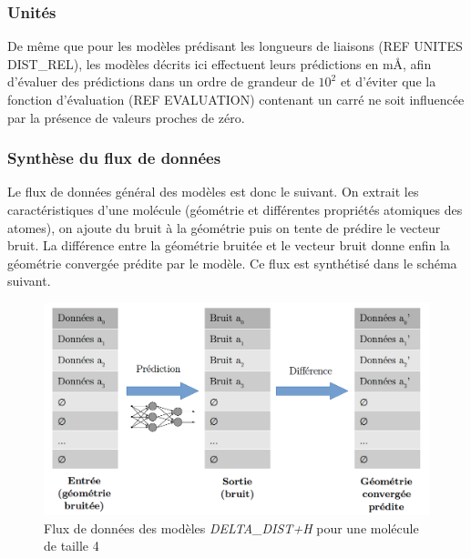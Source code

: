 \subsubsection{Unités}
\par De même que pour les modèles prédisant les longueurs de liaisons (REF UNITES DIST\_REL), les modèles décrits ici effectuent leurs prédictions en mÅ, afin d'évaluer des prédictions dans un ordre de grandeur de $10^2$ et d'éviter que la fonction d'évaluation (REF EVALUATION) contenant un carré ne soit influencée par la présence de valeurs proches de zéro.

\subsubsection{Synthèse du flux de données}
\par Le flux de données général des modèles est donc le suivant. On extrait les caractéristiques d'une molécule (géométrie et différentes propriétés atomiques des atomes), on ajoute du bruit à la géométrie puis on tente de prédire le vecteur bruit. La différence entre la géométrie bruitée et le vecteur bruit donne enfin la géométrie convergée prédite par le modèle. Ce flux est synthétisé dans le schéma suivant.

\vspace{0.5cm}

\begin{figure}[!h]
	\centering
	
	\includegraphics[scale=0.35]{images/flux_donnees.png}
	
	\caption{Flux de données des modèles \emph{DELTA\_DIST+H} pour une molécule de taille 4}
\end{figure}
